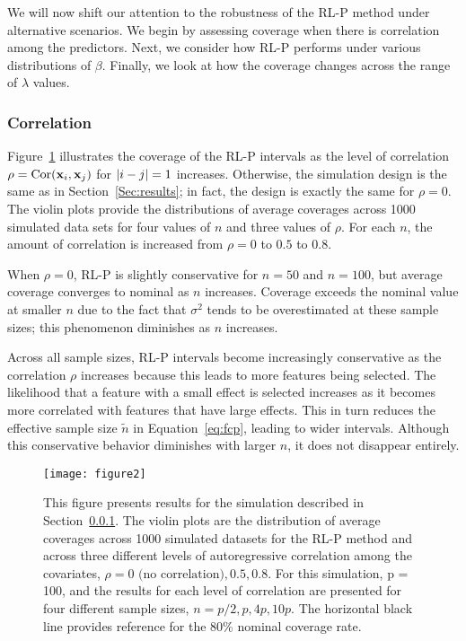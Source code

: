 We will now shift our attention to the robustness of the RL-P method under alternative scenarios. We begin by assessing coverage when there is correlation among the predictors. Next, we consider how RL-P performs under various distributions of $\beta$. Finally, we look at how the coverage changes across the range of $\lambda$ values.

\subsubsection{Correlation}
\label{Sec:correlation}

Figure~\ref{Fig:correlation_structure} illustrates the coverage of the RL-P intervals as the level of correlation $\rho = \textrm{Cor}(\mathbf{x}_i, \mathbf{x}_j)$ for $\left\lvert i-j\right\rvert = 1$ increases. Otherwise, the simulation design is the same as in Section~\ref{Sec:results}; in fact, the design is exactly the same for $\rho = 0$. The violin plots provide the distributions of average coverages across 1000 simulated data sets for four values of $n$ and three values of $\rho$. For each $n$, the amount of correlation is increased from $\rho = 0$ to $0.5$ to $0.8$.

When $\rho = 0$, RL-P is slightly conservative for $n = 50$ and $n = 100$, but average coverage converges to nominal as $n$ increases. Coverage exceeds the nominal value at smaller $n$ due to the fact that $\sigma^2$ tends to be overestimated at these sample sizes; this phenomenon diminishes as $n$ increases.

Across all sample sizes, RL-P intervals become increasingly conservative as the correlation $\rho$ increases because this leads to more features being selected. The likelihood that a feature with a small effect is selected increases as it becomes more correlated with features that have large effects. This in turn reduces the effective sample size $\tilde{n}$ in Equation~\ref{eq:fcp}, leading to wider intervals. Although this conservative behavior diminishes with larger $n$, it does not disappear entirely.

\begin{figure}[htb!]
  \begin{center}
    \texttt{[image: figure2]}
    \caption{\label{Fig:correlation_structure} This figure presents results for the simulation described in Section~\ref{Sec:correlation}. The violin plots are the distribution of average coverages across 1000 simulated datasets for the RL-P method and across three different levels of autoregressive correlation among the covariates, $\rho = 0 \text{ (no correlation)}, 0.5, 0.8$. For this simulation, p = 100, and the results for each level of correlation are presented for four different sample sizes, $n = p/2, p, 4p, 10p$. The horizontal black line provides reference for the 80\% nominal coverage rate.}
  \end{center}
\end{figure}

